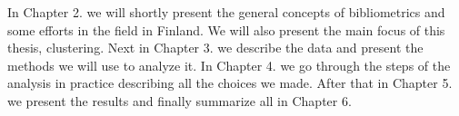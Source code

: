 

In Chapter 2. we will shortly present the general concepts of 
bibliometrics and some efforts in the field in Finland. We will 
also present the main focus of this thesis, clustering.
Next in Chapter 3. we describe the data and present the methods we 
will use to analyze it.
In Chapter 4. we go through the steps of the analysis in practice 
describing all the choices we made.
After that in Chapter 5. we present the results and finally 
summarize all in Chapter 6.











